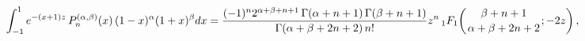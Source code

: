 \[\int_{-1}^{1}e^{-(x+1)z}\mathop{P^{(\alpha,\beta)}_{n}\/}\nolimits\!\left(x%
\right)(1-x)^{\alpha}(1+x)^{\beta}dx=\frac{(-1)^{n}2^{\alpha+\beta+n+1}\mathop%
{\Gamma\/}\nolimits\!\left(\alpha+n+1\right)\mathop{\Gamma\/}\nolimits\!\left(%
\beta+n+1\right)}{\mathop{\Gamma\/}\nolimits\!\left(\alpha+\beta+2n+2\right)n!%
}z^{n}\mathop{{{}_{1}F_{1}}\/}\nolimits\!\left({\beta+n+1\atop\alpha+\beta+2n+%
2};-2z\right),\]
